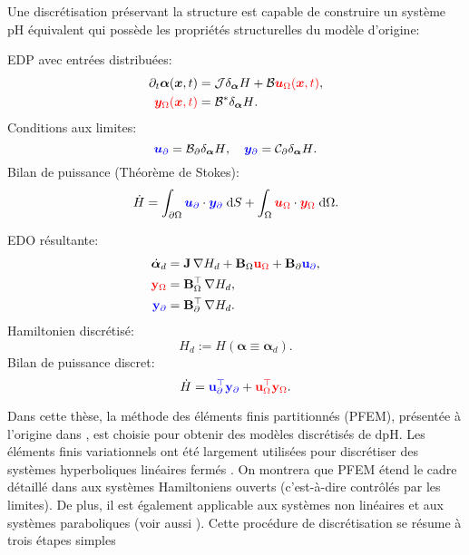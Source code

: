 Une discrétisation préservant la structure est capable de construire un système pH équivalent qui possède les propriétés structurelles du modèle d'origine:
\begin{tcbraster}[raster columns=2, raster equal height]
	\begin{tcolorbox}[width=0.4\textwidth, nobeforeafter, colframe=theme,title=Système pH de dimension infinie]%
		EDP avec entrées distribuées:
		\begin{align*}
		\partial_t {\bm{\alpha}}(\bm{x}, t) &= \mathcal{J} {\displaystyle \delta_{\bm{\alpha}} {H}}+ \mathcal{B} \textcolor{red}{\bm{u}_\Omega(\bm{x}, t)}, \\
		\textcolor{red}{\bm{y}_\Omega(\bm{x}, t)} &= \mathcal{B}^* {\displaystyle  \delta_{\bm{\alpha}} {H}}.
		\end{align*}
		Conditions aux limites: 
		\[\textcolor{blue}{\bm{u}_\partial} = \mathcal{B}_\partial{\displaystyle  \delta_{\bm{\alpha}} {H}}, \quad \textcolor{blue}{\bm{y}_\partial} = \mathcal{C}_\partial {\displaystyle  \delta_{\bm{\alpha}} {H}}. \]
		Bilan de puissance (Théorème de Stokes): 
		\[ \dot{H} = \displaystyle \int_{\partial \Omega} \textcolor{blue}{\bm{u}_\partial} \cdot \textcolor{blue}{\bm{y}_\partial} \d{S} +  \int_{\Omega} \textcolor{red}{\bm{u}_\Omega} \cdot \textcolor{red}{\bm{y}_\Omega} \d{\Omega}.
		\]
	\end{tcolorbox} 
	\begin{tcolorbox}[width=0.4\textwidth, nobeforeafter,  colframe=theme,title=Discretisation préservant la structure]%
		EDO résultante:
		\begin{align*}
		\dot{\bm{\alpha}}_d &= \mathbf{J} \, {\nabla {H}_d} + \mathbf{B}_\Omega \textcolor{red}{\mathbf{u}_\Omega} + \mathbf{B}_\partial \textcolor{blue}{\mathbf{u}_\partial}, \\
		\textcolor{red}{\mathbf{y}_\Omega} &= \mathbf{B}_\Omega^\top \, {\nabla {H}_d}, \\
		\textcolor{blue}{\mathbf{y}_\partial} &= \mathbf{B}_\partial^\top \,{\nabla {H}_d}.
		\end{align*}
		Hamiltonien discrétisé:
		\[
		H_d := H(\bm{\alpha} \equiv \bm{\alpha}_d).
		\]
		Bilan de puissance discret: 
		\[ \dot{H} = \textcolor{blue}{\mathbf{u}_\partial^\top \mathbf{y}_\partial} +  \textcolor{red}{\mathbf{u}_\Omega^\top \mathbf{y}_\Omega}.
		\]
	\end{tcolorbox}
\end{tcbraster}
\vspace{.5cm}
Dans cette thèse, la méthode des éléments finis partitionnés (PFEM), présentée à l'origine dans \cite{cardoso2018pfem,cardoso2019partitioned}, est choisie pour obtenir des modèles discrétisés de dpH. Les éléments finis variationnels ont été largement utilisées pour discrétiser des systèmes hyperboliques linéaires fermés \cite{joly2003variational}. On montrera que PFEM étend le cadre détaillé dans \cite{joly2003variational} aux systèmes Hamiltoniens ouverts (c'est-à-dire contrôlés par les limites). De plus, il est également applicable aux systèmes non linéaires  et aux systèmes paraboliques  (voir aussi \cite{serhani2019modeling,serhani2019discretization}). Cette procédure de discrétisation se résume à trois étapes simples
